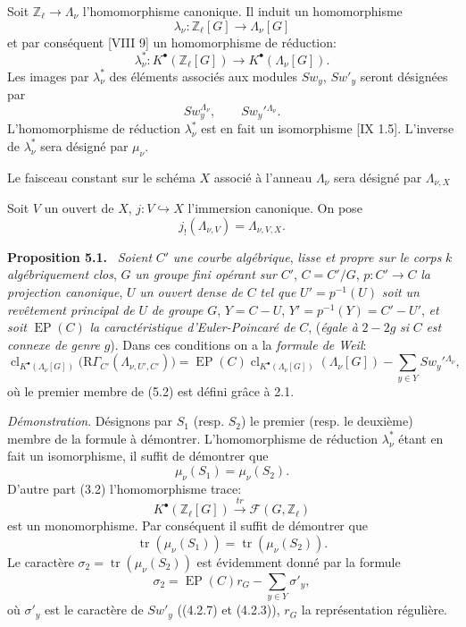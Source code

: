 \documentclass[11pt]{article}
\newenvironment{statement}[1]{\par\medskip\noindent\textbf{#1.}\ }{\par\medskip}
\providecommand{\EP}{\operatorname{EP}}
\providecommand{\EP}{\operatorname{EP}}
\providecommand{\clKstar}[1]{\operatorname{cl}_{K^{\bullet}(#1)}}
\begin{document}
Soit $\mathbb Z_\ell\to\Lambda_\nu$ l'homomorphisme canonique. Il induit un homomorphisme
\[
\lambda_\nu:\mathbb Z_\ell[G]\longrightarrow \Lambda_\nu[G]
\]
et par conséquent [VIII 9] un homomorphisme de réduction:
\[
\lambda_\nu^*:K^{\bullet}(\mathbb Z_\ell[G])\longrightarrow K^{\bullet}(\Lambda_\nu[G]).
\]
Les images par $\lambda_\nu^*$ des éléments associés aux modules $Sw_y$, $Sw'_y$ seront désignées par
\[
Sw_y^{\Lambda_\nu},\qquad Sw_y'{}^{\Lambda_\nu}.
\]
L'homomorphisme de réduction $\lambda_\nu^*$ est en fait un isomorphisme [IX 1.5]. L'inverse de $\lambda_\nu^*$ sera désigné par $\mu_\nu$.

Le faisceau constant sur le schéma $X$ associé à l'anneau $\Lambda_\nu$ sera désigné par $\Lambda_{\nu,X}$

Soit $V$ un ouvert de $X$, $j:V\hookrightarrow X$ l'immersion canonique. On pose
\[
j_!(\Lambda_{\nu,V})=\Lambda_{\nu,V,X}.
\]

\begin{statement}{Proposition 5.1}
\emph{Soient} $C'$ \emph{une courbe algébrique}, \emph{lisse et propre sur le corps} $k$ \emph{algébriquement clos}, $G$ \emph{un groupe fini opérant sur} $C'$, $C=C'/G$, $p:C'\to C$ \emph{la projection canonique}, $U$ \emph{un ouvert dense de} $C$ \emph{tel que} $U'=p^{-1}(U)$ \emph{soit un revêtement principal de} $U$ \emph{de groupe} $G$, $Y=C-U$, $Y'=p^{-1}(Y)=C'-U'$, \emph{et soit} $\EP(C)$ \emph{la caractéristique d'Euler-Poincaré de} $C$, (\emph{égale à} $2-2g$ \emph{si} $C$ \emph{est connexe de genre} $g$).
Dans ces conditions on a la \emph{formule de Weil}:
\[
\clKstar{\Lambda_\nu[G]}\bigl(\mathrm{R}\Gamma_{C'}(\Lambda_{\nu,U',C'})\bigr)
=
\EP(C)\clKstar{\Lambda_\nu[G]}(\Lambda_\nu[G])
-\sum_{y\in Y}Sw_y'{}^{\Lambda_\nu},
\tag{5.2}
\]
où le premier membre de (5.2) est défini grâce à 2.1.
\end{statement}

\emph{Démonstration}. Désignons par $S_1$ (resp. $S_2$) le premier (resp. le deuxième) membre de la formule à démontrer. L'homomorphisme de réduction $\lambda_\nu^*$ étant en fait un isomorphisme, il suffit de démontrer que
\[
\mu_\nu(S_1)=\mu_\nu(S_2).
\]
D'autre part (3.2) l'homomorphisme trace:
\[
K^{\bullet}(\mathbb Z_\ell[G])\xrightarrow{\ tr\ }\mathcal F(G,\mathbb Z_\ell)
\]
est un monomorphisme. Par conséquent il suffit de démontrer que
\[
\operatorname{tr}(\mu_\nu(S_1))=\operatorname{tr}(\mu_\nu(S_2)).
\]
Le caractère $\sigma_2=\operatorname{tr}(\mu_\nu(S_2))$ est évidemment donné par la
formule
\[
\sigma_2=\EP(C)r_G-\sum_{y\in Y}\sigma'_y,
\tag{5.2.1}
\]
où $\sigma'_y$ est le caractère de $Sw'_y$ ((4.2.7) et (4.2.3)), $r_G$ la représentation régulière.
\end{document}
